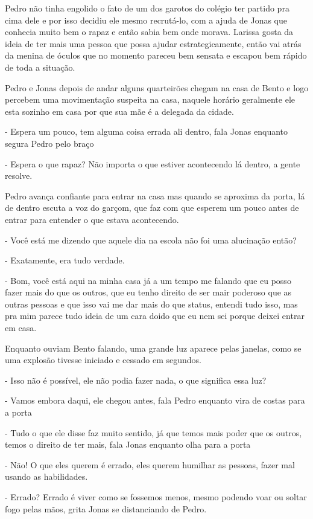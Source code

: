 Pedro não tinha engolido o fato de um dos garotos do colégio ter partido pra cima dele e por isso decidiu ele mesmo recrutá-lo, com a ajuda de Jonas que conhecia muito bem o rapaz e então sabia bem onde morava. Larissa gosta da ideia de ter mais uma pessoa que possa ajudar estrategicamente, então vai atrás da menina de óculos que no momento pareceu bem sensata e escapou bem rápido de toda a situação.

Pedro e Jonas depois de andar alguns quarteirões chegam na casa de Bento e logo percebem uma movimentação suspeita na casa, naquele horário geralmente ele esta sozinho em casa por que sua mãe é a delegada da cidade.

- Espera um pouco, tem alguma coisa errada ali dentro, fala Jonas enquanto segura Pedro pelo braço

- Espera o que rapaz? Não importa o que estiver acontecendo lá dentro, a gente resolve.


Pedro avança confiante para entrar na casa mas quando se aproxima da porta, lá de dentro escuta a voz do garçom, que faz com que esperem um pouco antes de entrar para entender o que estava acontecendo.

- Você está me dizendo que aquele dia na escola não foi uma alucinação então?

- Exatamente, era tudo verdade.

- Bom, você está aqui na minha casa já a um tempo me falando que eu posso fazer mais do que os outros, que eu tenho direito de ser mair poderoso que as outras pessoas e que isso vai me dar mais do que status, entendi tudo isso, mas pra mim parece tudo ideia de um cara doido que eu nem sei porque deixei entrar em casa.


Enquanto ouviam Bento falando, uma grande luz aparece pelas janelas, como se uma explosão tivesse iniciado e cessado em segundos.

- Isso não é possível, ele não podia fazer nada, o que significa essa luz?

- Vamos embora daqui, ele chegou antes, fala Pedro enquanto vira de costas para a porta

- Tudo o que ele disse faz muito sentido, já que temos mais poder que os outros, temos o direito de ter mais, fala Jonas enquanto olha para a porta

- Não! O que eles querem é errado, eles querem humilhar as pessoas, fazer mal usando as habilidades.

- Errado? Errado é viver como se fossemos menos, mesmo podendo voar ou soltar fogo pelas mãos, grita Jonas se distanciando de Pedro.


